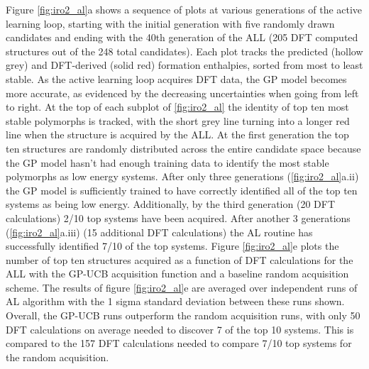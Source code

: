 %
Figure \ref{fig:iro2_al}a shows a sequence of plots at various generations of the active learning loop,
starting with the initial generation with five randomly drawn candidates and ending with the 40th generation of the ALL
(205  DFT computed structures out of the 248 total candidates).
%
Each plot tracks the predicted (hollow grey) and DFT-derived (solid red) formation enthalpies, sorted from most to least stable.
%
As the active learning loop acquires DFT data, the GP model becomes more accurate, as evidenced by the decreasing uncertainties when going from left to right.
%
At the top of each subplot of \ref{fig:iro2_al} the identity of top ten most stable polymorphs is tracked,
with the short grey line turning into a longer red line when the structure is acquired by the ALL.
%
At the first generation the top ten structures are randomly distributed across the entire candidate space because the GP model hasn't had enough training data to identify the most stable polymorphs as low energy systems.
%
After only three generations (\ref{fig:iro2_al}a.ii) the GP model is sufficiently trained to have correctly identified all of the top ten systems as being low energy.
%
Additionally, by the third generation (20 DFT calculations) 2/10 top systems have been acquired.
%
After another 3 generations (\ref{fig:iro2_al}a.iii) (15 additional DFT calculations) the AL routine has successfully identified 7/10 of the top systems.
%
Figure \ref{fig:iro2_al}e plots the number of top ten structures acquired as a function of DFT calculations for the ALL with the GP-UCB acquisition function and a baseline random acquisition scheme.
%
The results of figure \ref{fig:iro2_al}e are averaged over independent runs of AL algorithm with the 1 sigma standard deviation between these runs shown.
%
Overall, the GP-UCB runs outperform the random acquisition runs, with only 50 DFT calculations on average needed to discover 7 of the top 10 systems.
%
This is compared to the 157 DFT calculations needed to compare 7/10 top systems for the random acquisition.

